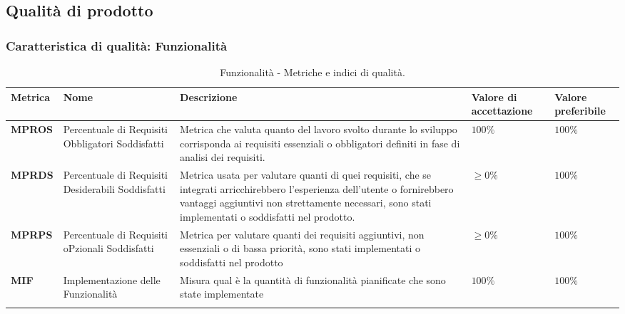 \subsection{Qualità di prodotto}

\subsubsection{Caratteristica di qualità: Funzionalità}
\hspace{1pt}
    \begin{longtable}{|C{1.5cm}|L{3cm}|L{4cm}|L{2.5cm}|L{2.5cm}|}
        \hline
        \textbf{Metrica} & \textbf{Nome} & \textbf{Descrizione} & \textbf{Valore di accettazione} & \textbf{Valore preferibile} \\
        \hline
        \textbf{MPROS} & Percentuale di Requisiti Obbligatori Soddisfatti & Metrica che valuta quanto del lavoro svolto durante lo sviluppo corrisponda ai requisiti essenziali o obbligatori definiti in fase di analisi dei requisiti.  & $ 100\%$  & $ 100\%$ \\
        \hline
        \textbf{MPRDS} & Percentuale di Requisiti Desiderabili Soddisfatti & Metrica usata per valutare quanti di quei requisiti, che se integrati arricchirebbero l'esperienza dell'utente o fornirebbero vantaggi aggiuntivi non strettamente necessari, sono stati implementati o soddisfatti nel prodotto. & $\geq 0\%$ & $100\%$ \\
        \hline
        \textbf{MPRPS} & Percentuale di Requisiti oPzionali Soddisfatti & Metrica per valutare quanti dei requisiti aggiuntivi, non essenziali o di bassa priorità, sono stati implementati o soddisfatti nel prodotto & $\geq 0\%$ & $100\%$ \\
        \hline
        \textbf{MIF} & Implementazione delle Funzionalità & Misura qual è la quantità di funzionalità pianificate che sono state implementate & $ 100\%$ & $ 100\%$ \\
        \hline
        \caption{Funzionalità - Metriche e indici di qualità.}
        \label{tab:metriche_funzionalità_testo}
    \end{longtable}

